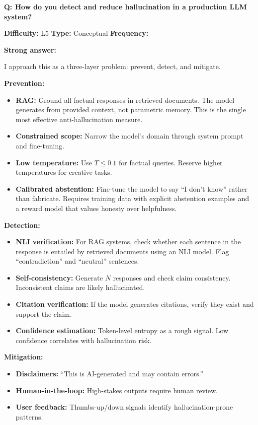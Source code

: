 
\begin{interviewq}
\textbf{Q: How do you detect and reduce hallucination in a production LLM system?}

\textbf{Difficulty:} L5 \quad \textbf{Type:} Conceptual \quad \textbf{Frequency:} \freqhigh{}

\textbf{Strong answer:}

I approach this as a three-layer problem: prevent, detect, and mitigate.

\textbf{Prevention:}
\begin{itemize}
    \item \textbf{RAG:} Ground all factual responses in retrieved documents. The model generates from provided context, not parametric memory. This is the single most effective anti-hallucination measure.
    \item \textbf{Constrained scope:} Narrow the model's domain through system prompt and fine-tuning.
    \item \textbf{Low temperature:} Use $T \leq 0.1$ for factual queries. Reserve higher temperatures for creative tasks.
    \item \textbf{Calibrated abstention:} Fine-tune the model to say ``I don't know'' rather than fabricate. Requires training data with explicit abstention examples and a reward model that values honesty over helpfulness.
\end{itemize}

\textbf{Detection:}
\begin{itemize}
    \item \textbf{NLI verification:} For RAG systems, check whether each sentence in the response is entailed by retrieved documents using an NLI model. Flag ``contradiction'' and ``neutral'' sentences.
    \item \textbf{Self-consistency:} Generate $N$ responses and check claim consistency. Inconsistent claims are likely hallucinated.
    \item \textbf{Citation verification:} If the model generates citations, verify they exist and support the claim.
    \item \textbf{Confidence estimation:} Token-level entropy as a rough signal. Low confidence correlates with hallucination risk.
\end{itemize}

\textbf{Mitigation:}
\begin{itemize}
    \item \textbf{Disclaimers:} ``This is AI-generated and may contain errors.''
    \item \textbf{Human-in-the-loop:} High-stakes outputs require human review.
    \item \textbf{User feedback:} Thumbs-up/down signals identify hallucination-prone patterns.
\end{itemize}


\end{interviewq}
